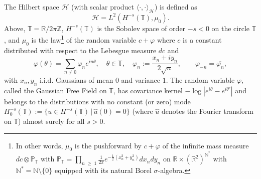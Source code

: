 \documentclass[11pt]{amsart}
\numberwithin{equation}{section}
\theoremstyle{definition}
\renewcommand{\geq}{\;\geqslant\;}                   %
\newcommand{\R}{\mathbb{R}}
\newcommand{\Z}{\mathbb{Z}}
\newcommand{\N}{\mathbb{N}}
\newcommand{\mc}{\mathcal}
\def\T{\mathbb{T}}
\begin{document}
The Hilbert space $\mc{H}$ (with scalar product $\langle \cdot , \cdot \rangle_{\mc{H}}$) is defined as 
\[ \mc{H}=L^2(H^{-s}(\T), \mu_0).\]
Above, $\T=\R/2\pi \Z$, $H^{-s}(\T)$ is the Sobolev space of order $-s<0$ on the circle $\T$, and $\mu_0$ is the law\footnote{In other words, $\mu_0$ is the pushforward by $c+\varphi$ of the infinite mass measure $dc\otimes \mathbb{P}_{\mathbb{T}}$ with $ \mathbb{P}_{\mathbb{T}}=\prod_{n \geq 1}\frac{1}{2\pi} e^{-\frac 12(x_n^2 + y_n^2)} dx_n dy_n$ on $\R\times (\R^2)^{\N^\ast}$ with $\N^\ast= \N \setminus \lbrace 0 \rbrace$ equipped with its natural Borel $\sigma$-algebra.} of the random variable $c+\varphi$ where $c$ is a constant distributed with respect to the Lebesgue measure $dc$ and
\begin{equation}
\varphi(\theta)
=
\sum_{n \neq 0} \varphi_{n} e^{ i n \theta},  \quad\theta \in \T, \quad \varphi_{n} 
:= 
\frac{x_n + i y_n}{2 \sqrt n} , \qquad \varphi_{-n} = \overline{\varphi_{n}},
\end{equation}
with $x_n,y_n$ i.i.d. Gaussians of mean $0$ and variance $1$. The random variable $\varphi$, called the Gaussian Free Field on $\T$, has covariance kernel $-\log |e^{i\theta}-e^{i\theta'}|$ and belongs to the distributions with no constant (or zero) mode $H_0^{-s}(\T):=\{u\in H^{-s}(\T)\,|\, \hat u(0) =0\}$ (where $\hat u$ denotes the Fourier transform on $\T$) almost surely for all $s>0$.
\end{document}
